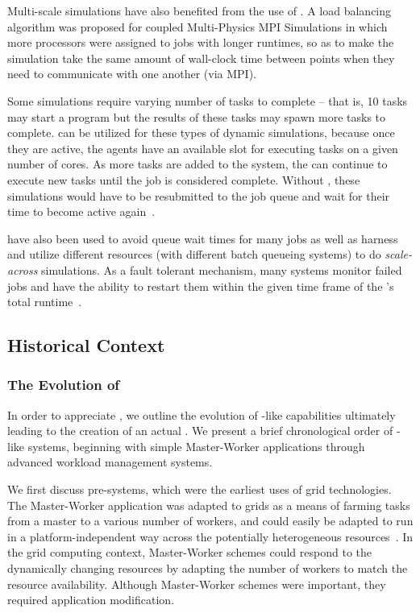 \documentclass{sig-alternate}
\begin{document}
Multi-scale simulations have also benefited from the use of
\pilotjobs. A \pilotjob load balancing algorithm was proposed for
coupled Multi-Physics MPI Simulations \cite{ko-efficient} in which
more processors were assigned to jobs with longer runtimes, so as to
make the simulation take the same amount of wall-clock time between
points when they need to communicate with one another (via MPI).

Some simulations require varying number of tasks to complete -- that
is, 10 tasks may start a program but the results of these tasks may
spawn more tasks to complete. \pilotjobs can be utilized for these
types of dynamic simulations, because once they are active, the agents
have an available slot for executing tasks on a given number of
cores. As more tasks are added to the system, the \pilot can continue
to execute new tasks until the job is considered
complete. Without \pilotjobs, these simulations would have to be
resubmitted to the job queue and wait for their time to become active again~\cite{luckow2009adaptive}. 

\pilotjobs have also been used to avoid queue wait times for many jobs
as well as harness and utilize different resources (with different
batch queueing systems) to do \textit{scale-across} simulations.
As a fault tolerant mechanism, many \pilotjob systems monitor
failed jobs and have the ability to restart them within the given 
time frame of the \pilotjob's total runtime~\cite{1742-6596-219-6-062049,condor-g,nilsson2011atlas}. 

\subsection{Historical Context}
\subsubsection*{The Evolution of \pilotjobs}

In order to appreciate \pilotjobs, we outline the evolution of
\pilot-like capabilities ultimately leading to the creation of an actual
\pilotjob. We present a brief chronological order of \pilotjob-like
systems, beginning with simple Master-Worker applications through
advanced workload management systems.

We first discuss pre-\pilotjob systems, which were the earliest uses of grid technologies. The Master-Worker application was adapted to grids as a means of farming tasks from a master to a various number of workers, and could easily be adapted to run in a platform-independent way across the potentially heterogeneous resources~\cite{masterworker, Goux00anenabling}. In the grid computing context, Master-Worker schemes could respond to the dynamically changing resources by adapting the number of workers to match the resource availability. Although Master-Worker schemes were important, they required application modification.
\end{document}
